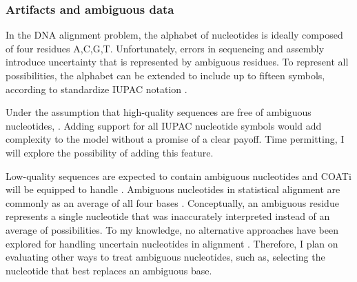 
\subsubsection{Artifacts and ambiguous data}


In the DNA alignment problem, the alphabet of nucleotides is ideally composed
of four residues {A,C,G,T}.
Unfortunately, errors in sequencing and assembly introduce uncertainty that is
represented by ambiguous residues.
To represent all possibilities, the alphabet can be extended to include up to
fifteen symbols, according to standardize IUPAC notation .


Under the assumption that high-quality sequences are free of ambiguous
nucleotides, .
Adding support for all IUPAC nucleotide symbols would add complexity to the
model without a promise of a clear payoff.
Time permitting, I will explore the possibility of adding this feature.

Low-quality sequences are expected to contain ambiguous nucleotides and COATi
will be equipped to handle .
Ambiguous nucleotides in statistical alignment are commonly 
as an average of all four bases .
Conceptually, an ambiguous residue represents a single nucleotide that was
inaccurately interpreted instead of an average of possibilities.
To my knowledge, no alternative approaches have been explored for handling
uncertain nucleotides in alignment .
Therefore, I plan on evaluating other ways to treat ambiguous nucleotides, such
as, selecting the nucleotide that best replaces an ambiguous base.

